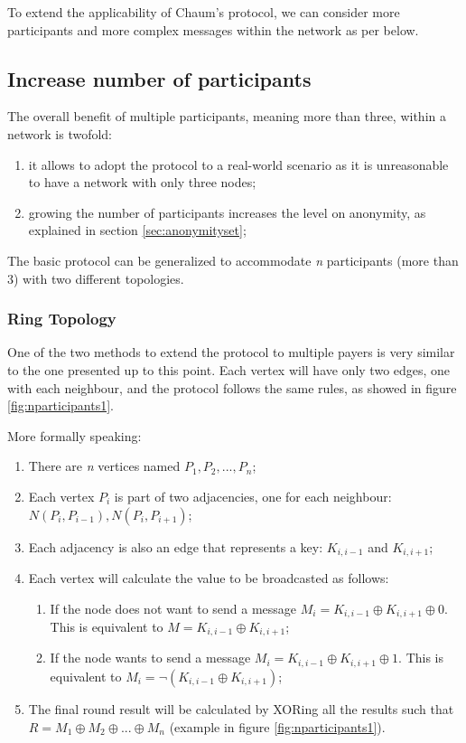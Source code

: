 To extend the applicability of Chaum's protocol, we can consider more participants and more complex messages within the network as per below.

\subsection{Increase number of participants} \label{sec:participantsextention}
The overall benefit of multiple participants, meaning more than three, within a network is twofold:
\begin{enumerate}
    \item it allows to adopt the protocol to a real-world scenario as it is unreasonable to have a network with only three nodes;
    \item growing the number of participants increases the level on anonymity, as explained in section \ref{sec:anonymityset};
\end{enumerate} 

The basic protocol can be generalized to accommodate \textit{n} participants (more than 3) with two different topologies.


\subsubsection{Ring Topology} \label{sec:ringtopology}
One of the two methods to extend the protocol to multiple payers is very similar to the one presented up to this point. Each vertex will have only two edges, one with each neighbour, and the protocol follows the same rules, as showed in figure \ref{fig:nparticipants1}.

More formally speaking: 
\begin{enumerate}
    \item There are \textit{n} vertices named \textit{$P_1, P_2, ..., P_n$};
    \item Each vertex \textit{$P_i$} is part of two adjacencies, one for each neighbour: \textit{$N(P_i,P_{i-1}), N(P_i, P_{i+1})$};
    \item Each adjacency is also an edge that represents a key: \textit{$K_{i,i-1}$} and \textit{$K_{i,i+1}$};
    \item Each vertex will calculate the value to be broadcasted as follows: \begin{enumerate}
        \item If the node does not want to send a message \textit{$M_i = K_{i,i-1} \oplus K_{i,i+1} \oplus 0 $}. This is equivalent to \textit{$M = K_{i,i-1} \oplus K_{i,i+1}$};
        \item If the node wants to send a message \textit{$M_i = K_{i,i-1} \oplus K_{i,i+1} \oplus 1 $}. This is equivalent to \textit{$M_i = \neg(K_{i,i-1} \oplus K_{i,i+1}) $};
    \end{enumerate}
    \item The final round result will be calculated by XORing all the results such that \textit{$R = M_1 \oplus M_2 \oplus ... \oplus M_n$} (example in figure \ref{fig:nparticipants1}).
\end{enumerate}


